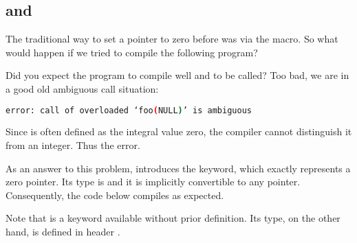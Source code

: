 \subsection{ and }

\problemtitle

The traditional way to set a pointer to zero before  was via the
 macro. So what would happen if we tried to compile the
following program?



Did you expect the program to compile well and  to be
called? Too bad, we are in a good old ambiguous call situation:

\begin{lstlisting}[language=bash]
error: call of overloaded ‘foo(NULL)’ is ambiguous
\end{lstlisting}

Since  is often defined as the integral value zero, the
compiler cannot distinguish it from an integer. Thus the error.

\solutiontitle

%
%
As an answer to this problem,  introduces the 
keyword, which exactly represents a zero pointer. Its type is
 and it is implicitly convertible to any
pointer. Consequently, the code below compiles as expected.



Note that  is a keyword available without prior
definition. Its type, on the other hand, is defined in header
.
